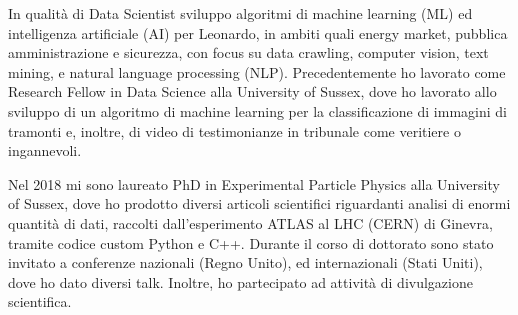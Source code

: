 	
In qualità di Data Scientist sviluppo algoritmi di machine learning (ML) ed intelligenza artificiale (AI) per Leonardo, in ambiti quali energy market, pubblica amministrazione e sicurezza, con focus su data crawling, computer vision, text mining, e natural language processing (NLP). Precedentemente ho lavorato come Research Fellow in Data Science alla University of Sussex, dove ho lavorato allo sviluppo di un algoritmo di machine learning per la classificazione di immagini di tramonti e, inoltre, di video di testimonianze in tribunale come veritiere o ingannevoli. 

Nel 2018 mi sono laureato PhD in Experimental Particle Physics alla University of Sussex, dove ho prodotto diversi articoli scientifici riguardanti analisi di enormi quantità di dati, raccolti dall'esperimento ATLAS al LHC (CERN) di Ginevra, tramite codice custom Python e C++. Durante il corso di dottorato sono stato invitato a conferenze nazionali (Regno Unito), ed internazionali (Stati Uniti), dove ho dato diversi talk. Inoltre, ho partecipato ad attività di divulgazione scientifica.
